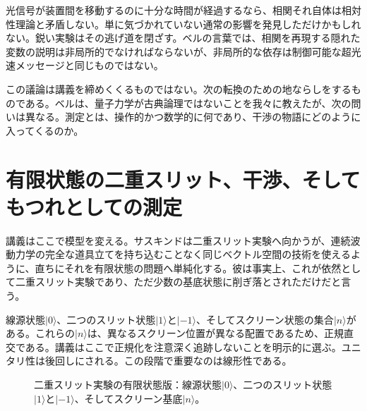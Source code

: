 光信号が装置間を移動するのに十分な時間が経過するなら、相関それ自体は相対性理論と矛盾しない。単に気づかれていない通常の影響を発見しただけかもしれない。鋭い実験はその逃げ道を閉ざす。ベルの言葉では、相関を再現する隠れた変数の説明は非局所的でなければならないが、非局所的な依存は制御可能な超光速メッセージと同じものではない。

\begin{classroomqa}
\end{classroomqa}

この議論は講義を締めくくるものではない。次の転換のための地ならしをするものである。ベルは、量子力学が古典論理ではないことを我々に教えたが、次の問いは異なる。測定とは、操作的かつ数学的に何であり、干渉の物語にどのように入ってくるのか。

\section{有限状態の二重スリット、干渉、そしてもつれとしての測定}

講義はここで模型を変える。サスキンドは二重スリット実験へ向かうが、連続波動力学の完全な道具立てを持ち込むことなく同じベクトル空間の技術を使えるように、直ちにそれを有限状態の問題へ単純化する。彼は事実上、これが依然として二重スリット実験であり、ただ少数の基底状態に削ぎ落とされただけだと言う。

線源状態\(|0\rangle\)、二つのスリット状態\(|1\rangle\)と\(|-1\rangle\)、そしてスクリーン状態の集合\(|n\rangle\)がある。これらの\(|n\rangle\)は、異なるスクリーン位置が異なる配置であるため、正規直交である。講義はここで正規化を注意深く追跡しないことを明示的に選ぶ。ユニタリ性は後回しにされる。この段階で重要なのは線形性である。

\begin{figure}[htbp]
\centering
{}
\caption{二重スリット実験の有限状態版：線源状態\(|0\rangle\)、二つのスリット状態\(|1\rangle\)と\(|-1\rangle\)、そしてスクリーン基底\(|n\rangle\)。}
\end{figure}

